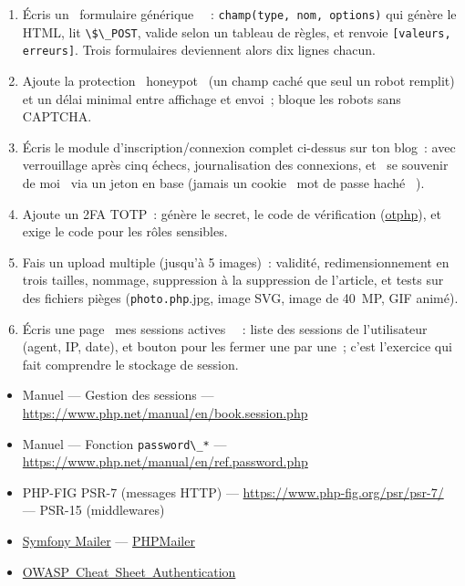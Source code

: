 \documentclass[12pt,a4paper,twoside,openright]{book}
\newcommand{\link}[2]{\href{#2}{#1}}
\begin{document}
\begin{exercice}
\begin{enumerate}
  \item \'Ecris un \og ~formulaire g\'en\'erique~ \fg{}~: \verb|champ(type, nom, options)| qui g\'en\`ere le HTML,
        lit \verb|\$\_POST|, valide selon un tableau de r\`egles, et renvoie
        \verb|[valeurs, erreurs]|. Trois formulaires deviennent alors dix lignes chacun.
  \item Ajoute la protection \og ~honeypot~ \fg{} (un champ cach\'e que seul un robot remplit) et un
        d\'elai minimal entre affichage et envoi~; bloque les robots sans CAPTCHA.
  \item \'Ecris le module d'inscription/connexion complet ci-dessus sur ton blog~: avec verrouillage
        apr\`es cinq \'echecs, journalisation des connexions, et \og ~se souvenir de moi~ \fg{} via un jeton
        en base (jamais un cookie \og ~mot de passe hach\'e~ \fg{}).
  \item Ajoute un 2FA TOTP~: g\'en\`ere le secret, le code de v\'erification (\link{otphp}{https://github.com/Spomky-Labs/otphp}),
        et exige le code pour les r\^oles sensibles.
  \item Fais un upload multiple (jusqu'\`a 5 images)~: validit\'e, redimensionnement en trois
        tailles, nommage, suppression \`a la suppression de l'article, et tests sur des fichiers
        pi\`eges (\verb|photo.php|.jpg, image SVG, image de 40~MP, GIF anim\'e).
  \item \'Ecris une page \og ~mes sessions actives~ \fg{}~: liste des sessions de l'utilisateur (agent,
        IP, date), et bouton pour les fermer une par une~; c'est l'exercice qui fait comprendre
        le stockage de session.
\end{enumerate}
\end{exercice}

\begin{ressources}
\begin{itemize}
  \item Manuel --- Gestion des sessions --- \url{https://www.php.net/manual/en/book.session.php}
  \item Manuel --- Fonction \verb|password\_*| --- \url{https://www.php.net/manual/en/ref.password.php}
  \item PHP-FIG PSR-7 (messages HTTP) --- \url{https://www.php-fig.org/psr/psr-7/} --- PSR-15 (middlewares)
  \item \link{Symfony Mailer}{https://symfony.com/doc/current/mailer.html} --- \link{PHPMailer}{https://github.com/PHPMailer/PHPMailer}
  \item \link{OWASP~Cheat~Sheet~Authentication}{https://cheatsheetseries.owasp.org/cheatsheets/Authentication\_Cheat\_Sheet.html}
\end{itemize}
\end{ressources}
\end{document}
